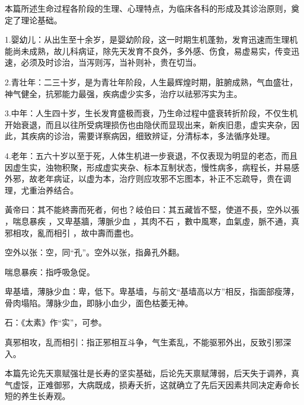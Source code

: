 \documentclass[draft,12pt]{ctexbook}
\begin{document}


本篇所述生命过程各阶段的生理、心理特点，为临床各科的形成及其诊治原则，奠定了理论基础。

1.婴幼儿：从出生至十余岁，是婴幼阶段，这一时期生机蓬勃，发育迅速而生理机能尚未成熟，故儿科病证，除先天发育不良外，多外感、伤食，易虚易实，传变迅速，必须及时诊治，当泻则泻，当补则补，贵在切当。

2.青壮年：二三十岁，是为青壮年阶段，人生最辉煌时期，脏腑成熟，气血盛壮，神气健全，抗邪能力最强，疾病虚少实多，治疗以祛邪泻实为主。

3.中年：人生四十岁，生长发育盛极而衰，乃生命过程中盛衰转折阶段，不仅生机开始衰退，而且以往所受病理损伤也由隐伏而显现出来，新疾旧患，虚实夹杂，因此，其疾病的诊治，需要详察病因，细致辨证，分清标本，多法循序处理。

4.老年：五六十岁以至于死，人体生机进一步衰退，不仅表现为明显的老态，而且因虚生实，浊物积聚，形成虚实夹杂、标本互制状态，慢性病多，病程长，并易感外邪，故老年病证，以虚为本，治疗则应攻邪不忘图本，补正不忘疏导，贵在调理，尤重治养结合。


\begin{yuanwen}
黃帝曰：其不能終壽而死者，何也？岐伯曰：其五藏皆不堅，使道不長，空外以張 ，喘息暴疾 ，又卑基牆，薄脈少血 ，其肉不石 ，數中風寒，血氣虛，脈不通，真邪相攻，亂而相引 ，故中壽而盡也。
\end{yuanwen}


\begin{jiaozhu}
  \item 空外以张：空，同“孔”。空外以张，指鼻孔外翻。
  \item 喘息暴疾：指呼吸急促。
  \item 卑基墙，薄脉少血：卑，低下。卑基墙，与前文“基墙高以方”相反，指面部瘦薄，骨肉塌陷。薄脉少血，即脉小血少，面色枯萎无神。
  \item 石：《太素》作“实”，可参。
  \item 真邪相攻，乱而相引：指正邪相互斗争，气生紊乱，不能驱邪外出，反致引邪深入。
\end{jiaozhu}



本篇先论先天禀赋强壮是长寿的坚实基础，后论先天禀赋薄弱，后天失于调养，真气虚馁，正难御邪，大病既成，损寿夭折，这就确立了先后天因素共同决定寿命长短的养生长寿观。
\end{document}
